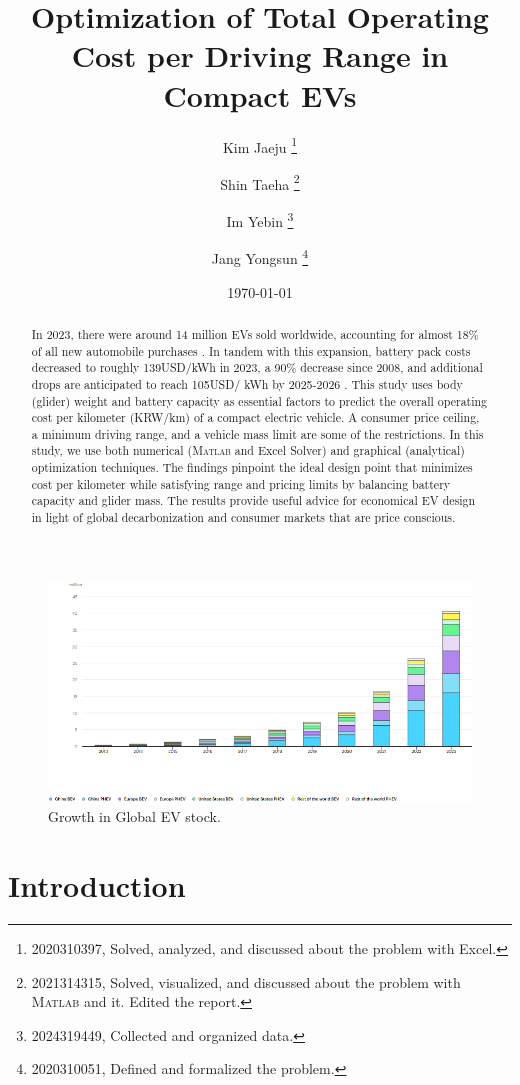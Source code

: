\documentclass[11pt,twocolumn]{article}
\title{\textbf{Optimization of Total Operating Cost per Driving Range in Compact EVs}}
\author{Kim Jaeju \thanks{2020310397, Solved, analyzed, and discussed about the problem with Excel.} \and Shin Taeha \thanks{2021314315, Solved, visualized, and discussed about the problem with \textsc{Matlab} and it. Edited the report.} \and Im Yebin \thanks{2024319449, Collected and organized data.} \and Jang Yongsun \thanks{2020310051, Defined and formalized the problem.}}
\date{\today}
\begin{document}
    \begin{titlepage}
        \maketitle
        \begin{abstract}
            In 2023, there were around 14 million EVs sold worldwide, accounting for almost 18\% of all new automobile purchases \cite{iea24}.
            In tandem with this expansion, battery pack costs decreased to roughly 139USD/kWh in 2023, a 90\% decrease since 2008, and additional drops are anticipated to reach 105USD/ kWh by 2025-2026 \cite{iea24}\cite{doe23}.
            This study uses body (glider) weight and battery capacity as essential factors to predict the overall operating cost per kilometer (KRW/km) of a compact electric vehicle.
            A consumer price ceiling, a minimum driving range, and a vehicle mass limit are some of the restrictions.
            In this study, we use both numerical (\textsc{Matlab} and Excel Solver) and graphical (analytical) optimization techniques.
            The findings pinpoint the ideal design point that minimizes cost per kilometer while satisfying range and pricing limits by balancing battery capacity and glider mass.
            The results provide useful advice for economical EV design in light of global decarbonization and consumer markets that are price conscious.
        \end{abstract}
    \end{titlepage}
    
    \begin{figure}[h]
        \centering
        \includegraphics[width=0.8\columnwidth]{growth.png}
        \caption{Growth in Global EV stock.}
        \label{growth}
    \end{figure}

    \section{Introduction}
\end{document}
